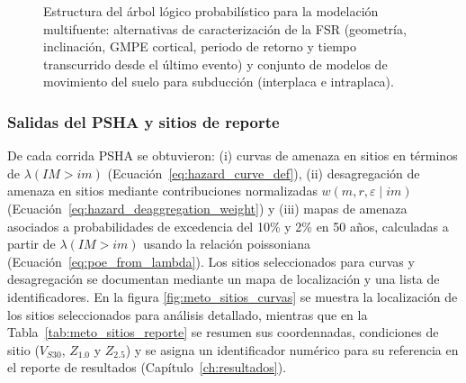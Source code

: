 \begin{figure}[H]

\caption{Estructura del árbol lógico probabilístico para la modelación multifuente: alternativas de caracterización de la FSR (geometría, inclinación, GMPE cortical, periodo de retorno y tiempo transcurrido desde el último evento) y conjunto de modelos de movimiento del suelo para subducción (interplaca e intraplaca).}
\label{fig:lt_probabilistico}
\end{figure}

\subsubsection{Salidas del PSHA y sitios de reporte}
\label{sec:meto_psha_out}

De cada corrida PSHA se obtuvieron: (i) curvas de amenaza en sitios en términos de $\lambda(IM>im)$ (Ecuación~\ref{eq:hazard_curve_def}), (ii) desagregación de amenaza en sitios mediante contribuciones normalizadas $w(m,r,\varepsilon\mid im)$ (Ecuación~\ref{eq:hazard_deaggregation_weight}) y (iii) mapas de amenaza asociados a probabilidades de excedencia del 10\% y 2\% en 50 años, calculadas a partir de $\lambda(IM>im)$ usando la relación poissoniana (Ecuación~\ref{eq:poe_from_lambda}). Los sitios seleccionados para curvas y desagregación se documentan mediante un mapa de localización y una lista de identificadores. En la figura \ref{fig:meto_sitios_curvas} se muestra la localización de los sitios seleccionados para análisis detallado, mientras que en la Tabla~\ref{tab:meto_sitios_reporte} se resumen sus coordennadas, condiciones de sitio ($V_{S30}$, $Z_{1.0}$ y $Z_{2.5}$) y se asigna un identificador numérico para su referencia en el reporte de resultados (Capítulo~\ref{ch:resultados}).

